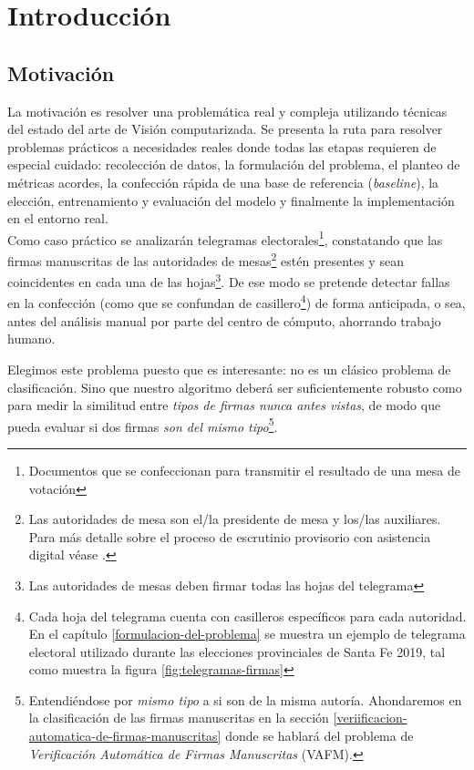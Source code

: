 \chapter{Introducción}

\section{Motivación}

La motivación es resolver una problemática real y compleja utilizando técnicas del estado del arte de Visión computarizada. Se presenta la ruta para resolver problemas prácticos a necesidades reales donde todas las etapas requieren de especial cuidado: recolección de datos, la formulación del problema, el planteo de métricas acordes, la confección rápida de una base de referencia (\textit{baseline}), la elección, entrenamiento y evaluación del modelo y finalmente la implementación en el entorno real.\\

Como caso práctico se analizarán telegramas electorales\footnote{Documentos que se confeccionan para transmitir el resultado de una mesa de votación}, constatando que las firmas manuscritas de las autoridades de mesas\footnote{Las autoridades de mesa son el/la presidente de mesa y los/las auxiliares. Para más detalle sobre el proceso de escrutinio provisorio con asistencia digital 
 véase \cite{unr-informe}.} estén presentes y sean coincidentes en cada una de las hojas\footnote{Las autoridades de mesas deben firmar todas las hojas del telegrama}. 
 De ese modo se pretende detectar fallas en la confección (como que se confundan de casillero\footnote{Cada hoja del telegrama cuenta con casilleros específicos para cada autoridad. 
 En el capítulo \ref{formulacion-del-problema} se muestra un ejemplo de telegrama electoral utilizado durante las elecciones provinciales de Santa Fe 2019, tal como muestra la figura \ref{fig:telegramas-firmas}}) de forma anticipada, o sea, antes del análisis manual por parte del centro de cómputo, ahorrando trabajo humano.

Elegimos este problema puesto que es interesante: no es un clásico problema de clasificación. Sino que nuestro algoritmo deberá ser suficientemente robusto como para medir la similitud entre \textit{tipos de firmas nunca antes vistas}, de modo que pueda evaluar si dos firmas \textit{son del mismo tipo}\footnote{Entendiéndose por \textit{mismo tipo} a si son de la misma autoría. Ahondaremos en la clasificación de las firmas manuscritas en la sección \ref{veriificacion-automatica-de-firmas-manuscritas} donde se hablará del problema de \textit{Verificación Automática de Firmas Manuscritas} (VAFM).}.\\

